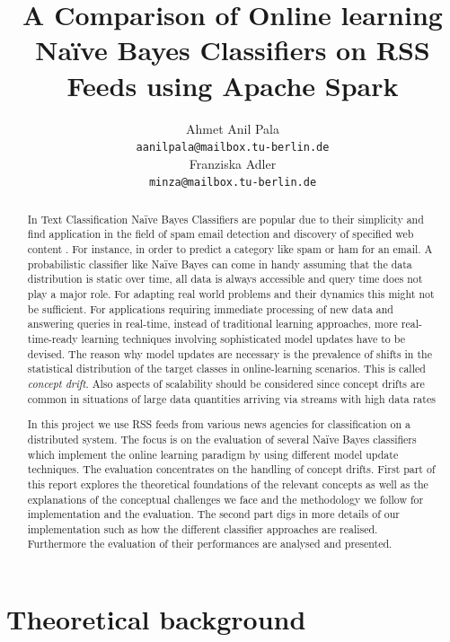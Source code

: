 \documentclass{article} %
\title{A Comparison of Online learning Na\"ive Bayes Classifiers on RSS Feeds using Apache Spark}
\author{
Ahmet Anil Pala\\
\texttt{aanilpala@mailbox.tu-berlin.de} \\
\And
Franziska Adler \\
\texttt{minza@mailbox.tu-berlin.de} \\
}
\begin{document}
\maketitle

\begin{abstract}
In Text Classification Na\"ive Bayes Classifiers are popular due to their simplicity and find application in the field of spam email detection and discovery of specified web content \cite[p. 225]{ertel2008}. For instance, in order to predict a category like spam or ham for an email. A probabilistic classifier like Na\"ive Bayes can come in handy assuming that the data distribution is static over time, all data is always accessible and query time does not play a major role. For adapting real world problems and their dynamics this might not be sufficient. For applications requiring immediate processing of new data and answering queries in real-time, instead of traditional learning approaches, more real-time-ready learning techniques involving sophisticated model updates have to be devised. The reason why model updates are necessary is the prevalence of shifts in the statistical distribution of the target classes in online-learning scenarios. This is called \textit{concept drift}. Also aspects of scalability should be considered since concept drifts are common in situations of large data quantities arriving via streams with high data rates \cite[p. 4]{tsymbal2004}   

In this project we use RSS feeds from various news agencies for classification on a distributed system. The focus is on the evaluation of several Na\"ive Bayes classifiers which implement the online learning paradigm by using different model update techniques.  The evaluation concentrates on the handling of concept drifts. First part of this report explores the theoretical foundations of the relevant concepts as well as the explanations of the conceptual challenges we face and the methodology we follow for implementation and the evaluation. The second part digs in more details of our implementation such as how the different classifier approaches are realised. Furthermore the evaluation of their performances are analysed and presented.

\end{abstract}

\section{Theoretical background}
\end{document}
